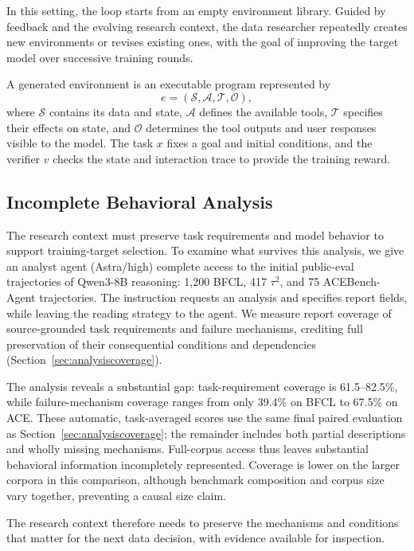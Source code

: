 In this setting, the loop starts from an empty environment library. Guided
by feedback and the evolving research context, the data researcher repeatedly
creates new environments or revises existing ones, with the goal of improving
the target model over successive training rounds.

A generated environment is an executable program represented by
\[
e=(\mathcal S,\mathcal A,\mathcal T,\mathcal O),
\]
where $\mathcal S$ contains its data and state, $\mathcal A$ defines the
available tools, $\mathcal T$ specifies their effects on state, and
$\mathcal O$ determines the tool outputs and user responses visible to the
model. The task $x$ fixes a goal and initial conditions, and the verifier
$v$ checks the state and interaction trace to provide the training reward.

\subsection{Incomplete Behavioral Analysis}
\label{sec:coveragegap}

The research context must preserve task requirements and model behavior
to support training-target selection. To examine what survives this
analysis, we give an analyst agent (Astra/high) complete access to the
initial public-eval trajectories of Qwen3-8B reasoning: 1,200 BFCL, 417
$\tau^2$, and 75 ACEBench-Agent trajectories. The instruction requests an
analysis and specifies report fields, while leaving the reading strategy to
the agent. We measure report coverage of source-grounded task requirements and
failure mechanisms, crediting full preservation of their consequential
conditions and dependencies (Section~\ref{sec:analysiscoverage}).

The analysis reveals a substantial gap: task-requirement coverage
is 61.5--82.5\%, while failure-mechanism coverage ranges from only 39.4\% on
BFCL to 67.5\% on ACE. These automatic, task-averaged scores use the same final
paired evaluation as Section~\ref{sec:analysiscoverage}; the remainder includes
both partial descriptions and wholly missing mechanisms. Full-corpus access
thus leaves substantial behavioral information incompletely represented.
Coverage is lower on the larger corpora in this comparison, although benchmark
composition and corpus size vary together, preventing a causal size claim.

The research context therefore needs to preserve the mechanisms and conditions
that matter for the next data decision, with evidence available for inspection.

